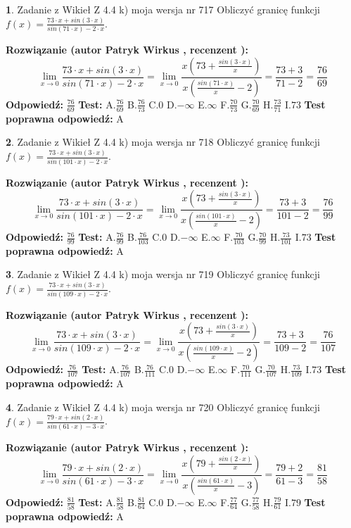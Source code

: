 \documentclass[12pt, a4paper]{article}
\theoremstyle{definition} %
\newtheorem{zad}{}
\newcommand{\zadStart}[1]{\begin{zad}#1\newline}
\newcommand{\zadStop}{\end{zad}}
\newcommand{\rozwStart}[2]{\noindent \textbf{Rozwiązanie (autor #1 , recenzent #2): }\newline}
\newcommand{\rozwStop}{\newline}
\newcommand{\odpStart}{\noindent \textbf{Odpowiedź:}\newline}
\newcommand{\odpStop}{\newline}
\newcommand{\testStart}{\noindent \textbf{Test:}\newline}
\newcommand{\testStop}{\newline}
\newcommand{\kluczStart}{\noindent \textbf{Test poprawna odpowiedź:}\newline}
\newcommand{\kluczStop}{\newline}
\begin{document}
\zadStart{Zadanie z Wikieł Z 4.4 k) moja wersja nr 717}
Obliczyć granicę funkcji $f(x)=\frac{73\cdot x +sin(3\cdot x)}{sin(71\cdot x) -2\cdot x}$.
\zadStop
\rozwStart{Patryk Wirkus}{}
$$\lim\limits_{x\to 0}\frac{73\cdot x +sin(3\cdot x)}{sin(71\cdot x) -2\cdot x}
=\lim\limits_{x\to 0}\frac{x(73+\frac{sin(3\cdot x)}{x})}{x(\frac{sin(71\cdot x)}{x}-2)}
=\frac{73+3}{71-2} = \frac{76}{69}$$
\rozwStop
\odpStart
$\frac{76}{69}$
\odpStop
\testStart
A.$\frac{76}{69}$
B.$\frac{76}{73}$
C.$0$
D.$-\infty$
E.$\infty$
F.$\frac{70}{73}$
G.$\frac{70}{69}$
H.$\frac{73}{71}$
I.$73$
\testStop
\kluczStart
A
\kluczStop



\zadStart{Zadanie z Wikieł Z 4.4 k) moja wersja nr 718}
Obliczyć granicę funkcji $f(x)=\frac{73\cdot x +sin(3\cdot x)}{sin(101\cdot x) -2\cdot x}$.
\zadStop
\rozwStart{Patryk Wirkus}{}
$$\lim\limits_{x\to 0}\frac{73\cdot x +sin(3\cdot x)}{sin(101\cdot x) -2\cdot x}
=\lim\limits_{x\to 0}\frac{x(73+\frac{sin(3\cdot x)}{x})}{x(\frac{sin(101\cdot x)}{x}-2)}
=\frac{73+3}{101-2} = \frac{76}{99}$$
\rozwStop
\odpStart
$\frac{76}{99}$
\odpStop
\testStart
A.$\frac{76}{99}$
B.$\frac{76}{103}$
C.$0$
D.$-\infty$
E.$\infty$
F.$\frac{70}{103}$
G.$\frac{70}{99}$
H.$\frac{73}{101}$
I.$73$
\testStop
\kluczStart
A
\kluczStop



\zadStart{Zadanie z Wikieł Z 4.4 k) moja wersja nr 719}
Obliczyć granicę funkcji $f(x)=\frac{73\cdot x +sin(3\cdot x)}{sin(109\cdot x) -2\cdot x}$.
\zadStop
\rozwStart{Patryk Wirkus}{}
$$\lim\limits_{x\to 0}\frac{73\cdot x +sin(3\cdot x)}{sin(109\cdot x) -2\cdot x}
=\lim\limits_{x\to 0}\frac{x(73+\frac{sin(3\cdot x)}{x})}{x(\frac{sin(109\cdot x)}{x}-2)}
=\frac{73+3}{109-2} = \frac{76}{107}$$
\rozwStop
\odpStart
$\frac{76}{107}$
\odpStop
\testStart
A.$\frac{76}{107}$
B.$\frac{76}{111}$
C.$0$
D.$-\infty$
E.$\infty$
F.$\frac{70}{111}$
G.$\frac{70}{107}$
H.$\frac{73}{109}$
I.$73$
\testStop
\kluczStart
A
\kluczStop



\zadStart{Zadanie z Wikieł Z 4.4 k) moja wersja nr 720}
Obliczyć granicę funkcji $f(x)=\frac{79\cdot x +sin(2\cdot x)}{sin(61\cdot x) -3\cdot x}$.
\zadStop
\rozwStart{Patryk Wirkus}{}
$$\lim\limits_{x\to 0}\frac{79\cdot x +sin(2\cdot x)}{sin(61\cdot x) -3\cdot x}
=\lim\limits_{x\to 0}\frac{x(79+\frac{sin(2\cdot x)}{x})}{x(\frac{sin(61\cdot x)}{x}-3)}
=\frac{79+2}{61-3} = \frac{81}{58}$$
\rozwStop
\odpStart
$\frac{81}{58}$
\odpStop
\testStart
A.$\frac{81}{58}$
B.$\frac{81}{64}$
C.$0$
D.$-\infty$
E.$\infty$
F.$\frac{77}{64}$
G.$\frac{77}{58}$
H.$\frac{79}{61}$
I.$79$
\testStop
\kluczStart
A
\kluczStop
\end{document}

